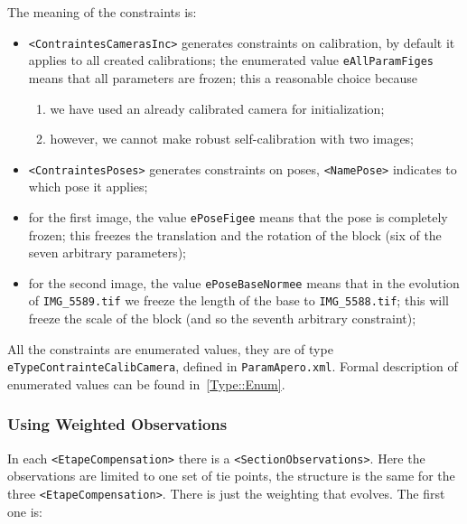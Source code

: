 The meaning of the constraints is:

\begin{itemize}
   \item {\tt <ContraintesCamerasInc>} generates constraints on calibration,
         by default it applies to all created calibrations;
         the enumerated value {\tt eAllParamFiges} means that all parameters are frozen;
         this a reasonable choice because %
\begin{enumerate}
    \item we have used an already calibrated camera for initialization;
    \item however, we cannot make robust self-calibration with two images;
\end{enumerate}

   \item {\tt <ContraintesPoses>} generates constraints on poses, {\tt <NamePose>}
         indicates to which pose it applies;

    \item for the first image, the value {\tt ePoseFigee} means that the pose
          is completely frozen; this freezes the translation and the rotation of the block (six of the
          seven arbitrary parameters);

    \item for the second image, the value {\tt ePoseBaseNormee} means that in
           the evolution of {\tt IMG\_5589.tif} we freeze the
          length of the base to  {\tt IMG\_5588.tif}; this will freeze the
          scale of the block (and so the seventh arbitrary constraint);
\end{itemize}

All the constraints are enumerated values, they are of type
{\tt eTypeContrainteCalibCamera}, defined in {\tt ParamApero.xml}.
Formal description of enumerated values can be found in~\ref{Type::Enum}.


\subsubsection{Using Weighted Observations}

In each {\tt <EtapeCompensation>} there is a {\tt <SectionObservations>}.
Here the observations are limited to one set of tie points, the structure
is the same for the three {\tt <EtapeCompensation>}. There is just
the weighting that evolves.  The first one is:

